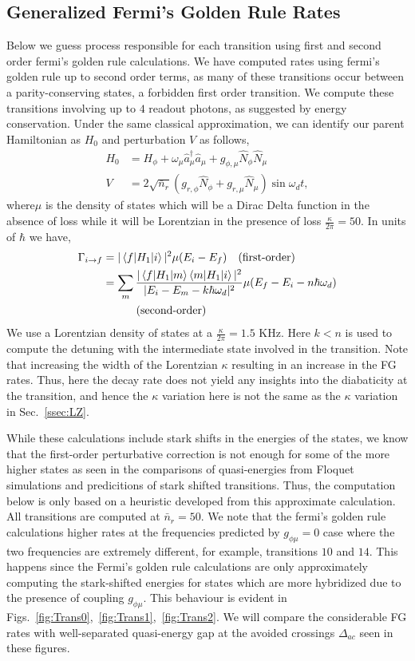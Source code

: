 \documentclass[%
reprint,
superscriptaddress,
 amsmath,amssymb,
 aps,
 prx,
longbibliography,
floatfix,
]{revtex4-2}
\begin{document}
\subsection{Generalized Fermi's Golden Rule Rates}\label{app:Floquet-trans}
Below we guess process responsible for each transition using first and second order fermi's golden rule calculations. We have computed rates using fermi's golden rule up to second order terms, as many of these transitions occur between a parity-conserving states, a forbidden first order transition. We compute these transitions involving up to $4$ readout photons, as suggested by energy conservation. 
Under the same classical approximation, we can identify our parent Hamiltonian as $H_0$ and perturbation $V$ as follows,
\begin{align}
H_0&=H_{\phi}+\omega_\mu \hat a_\mu^\dagger \hat a_\mu+g_{\phi,\mu}\hat N_\phi \hat N_\mu\\
V&=2\sqrt{\bar n_r}(g_{r,\phi} \hat N_\phi+g_{r,\mu}\hat N_\mu)\sin{\omega_d t},
\end{align}
where$\mu$ is the density of states which will be a Dirac Delta function in the absence of loss while it will be Lorentzian in the presence of loss $\frac{\kappa}{2\pi}=50$. In units of $\hbar$ we have,
\begin{align}
    \Gamma_{i\rightarrow f}&=|\braket{f|H_1|i}|^2\mu(E_i-E_f)\quad\textrm{(first-order)}\\
&=\sum_m\frac{|\braket{f|H_1|m}\braket{m|H_1|i}|^2}{|E_i-E_m-k\hbar\omega_d|^2}\mu(E_f-E_i-n\hbar \omega_d)\nonumber\\&\quad\quad\quad\textrm{(second-order)}
\end{align}
We use a Lorentzian density of states at a $\frac{\kappa}{2\pi}=1.5$ KHz. Here $k<n$ is used to compute the detuning with the intermediate state involved in the transition. Note that increasing the width of the Lorentzian $\kappa$ resulting in an increase in the FG rates. Thus, here the decay rate does not yield any insights into the diabaticity at the transition, and hence the $\kappa$ variation here is not the same as the $\kappa$ variation in Sec.~\ref{ssec:LZ}.

While these calculations include stark shifts in the energies of the states, we know that the first-order perturbative correction is not enough for some of the more higher states as seen in the comparisons of quasi-energies from Floquet simulations and predicitions of stark shifted transitions. Thus, the computation below is only based on a heuristic developed from this approximate calculation. All transitions are computed at $\bar n_r=50$. We note that the fermi's golden rule calculations higher rates at the frequencies predicted by $g_{\phi\mu}=0$ case where the two frequencies are extremely different, for example, transitions $10$ and $14$. This happens since the Fermi's golden rule calculations are only approximately computing the stark-shifted energies for states which are more hybridized due to the presence of coupling $g_{\phi\mu}$. This behaviour is evident in Figs.~\ref{fig:Trans0},~\ref{fig:Trans1},~\ref{fig:Trans2}. We will compare the considerable FG rates with well-separated quasi-energy gap at the avoided crossings  $\Delta_{ac}$ seen in these figures.
\end{document}
